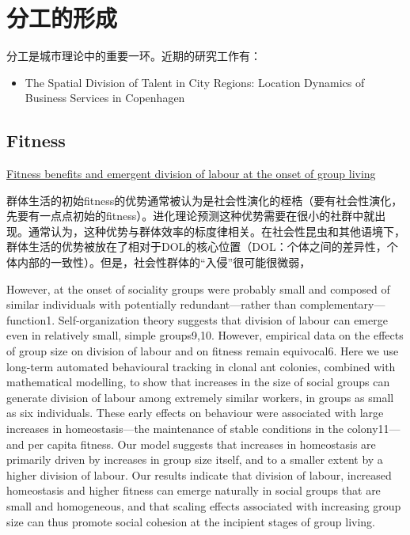 \chapter{分工的形成}

分工是城市理论中的重要一环。近期的研究工作有：

\begin{itemize}
    \item  The Spatial Division of Talent in City Regions: Location Dynamics of Business Services in Copenhagen
\end{itemize}

\section{Fitness}

\href{https://www.nature.com/articles/s41586-018-0422-6}{Fitness benefits and emergent division of labour at the onset of group living}

群体生活的初始fitness的优势通常被认为是社会性演化的桎梏（要有社会性演化，先要有一点点初始的fitness）。进化理论预测这种优势需要在很小的社群中就出现。通常认为，这种优势与群体效率的标度律相关。在社会性昆虫和其他语境下，群体生活的优势被放在了相对于DOL的核心位置（DOL：个体之间的差异性，个体内部的一致性）。但是，社会性群体的“入侵”很可能很微弱，

However, at the onset of sociality groups were probably small and composed of similar individuals with potentially redundant—rather than complementary—function1. Self-organization theory suggests that division of labour can emerge even in relatively small, simple groups9,10. However, empirical data on the effects of group size on division of labour and on fitness remain equivocal6. Here we use long-term automated behavioural tracking in clonal ant colonies, combined with mathematical modelling, to show that increases in the size of social groups can generate division of labour among extremely similar workers, in groups as small as six individuals. These early effects on behaviour were associated with large increases in homeostasis—the maintenance of stable conditions in the colony11—and per capita fitness. Our model suggests that increases in homeostasis are primarily driven by increases in group size itself, and to a smaller extent by a higher division of labour. Our results indicate that division of labour, increased homeostasis and higher fitness can emerge naturally in social groups that are small and homogeneous, and that scaling effects associated with increasing group size can thus promote social cohesion at the incipient stages of group living.